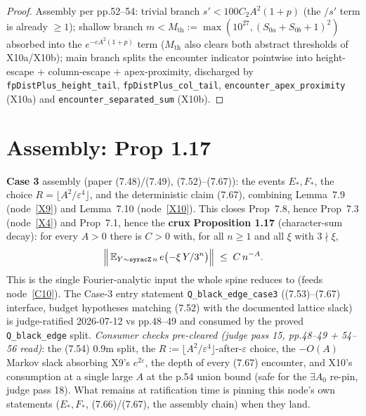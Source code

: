 \begin{proof}
  \leanok
  Assembly per pp.52--54: trivial branch \(s' < 100C_2A^2(1+p)\) (the \(/s'\) term is
  already \(\ge 1\)); shallow branch \(m < M_{\mathrm{th}} :=
  \max(10^{27}, (S_{0a}+S_{0b}+1)^2)\) absorbed into the \(e^{-cA^2(1+p)}\) term
  (\(M_{\mathrm{th}}\) also clears both abstract thresholds of X10a/X10b); main branch
  splits the encounter indicator pointwise into height-escape + column-escape +
  apex-proximity, discharged by \texttt{fpDistPlus\_height\_tail},
  \texttt{fpDistPlus\_col\_tail}, \texttt{encounter\_apex\_proximity} (X10a) and
  \texttt{encounter\_separated\_sum} (X10b).
\end{proof}

\section{Assembly: Prop 1.17}

\begin{proposition}\label{X11}
  \leanok
\textbf{Case 3} assembly (paper (7.48)/(7.49), (7.52)--(7.67)): the events \(E_*,F_*\), the
choice \(R=\lfloor A^2/\varepsilon^4\rfloor\), and the deterministic claim (7.67), combining
Lemma~7.9 (node~\ref{X9}) and Lemma~7.10 (node~\ref{X10}).  This closes Prop~7.8, hence
Prop~7.3 (node~\ref{X4}) and Prop~7.1, hence the \textbf{crux} \textbf{Proposition 1.17}
(character-sum decay): for every \(A>0\) there is \(C>0\) with, for all \(n\ge 1\) and all
\(\xi\) with \(3\nmid\xi\),
\[
  \Bigl\|\,\mathbb{E}_{Y\sim\texttt{syracZ}\,n}\, e\bigl(-\xi\, Y/3^{n}\bigr)\Bigr\|
    \;\le\; C\,n^{-A}.
\]
This is the single Fourier-analytic input the whole spine reduces to (feeds node~\ref{C10}).
The Case-3 entry statement \texttt{Q\_black\_edge\_case3} ((7.53)--(7.67) interface, budget
hypotheses matching (7.52) with the documented lattice slack) is judge-ratified 2026-07-12
vs pp.48--49 and consumed by the proved \texttt{Q\_black\_edge} split.
\emph{Consumer checks pre-cleared (judge pass 15, pp.48--49 + 54--56 read)}: the (7.54)
0.9m split, the \(R := \lfloor A^2/\varepsilon^4\rfloor\)-after-\(\varepsilon\) choice,
the \(-O(A)\) Markov slack absorbing X9's \(e^{2\varepsilon}\), the depth of every
(7.67) encounter, and X10's consumption at a single large \(A\) at the p.54 union bound
(safe for the \(\exists A_0\) re-pin, judge pass 18).
What remains at ratification time is pinning this node's own statements
(\(E_*, F_*\), (7.66)/(7.67), the assembly chain) when they land.
\end{proposition}

